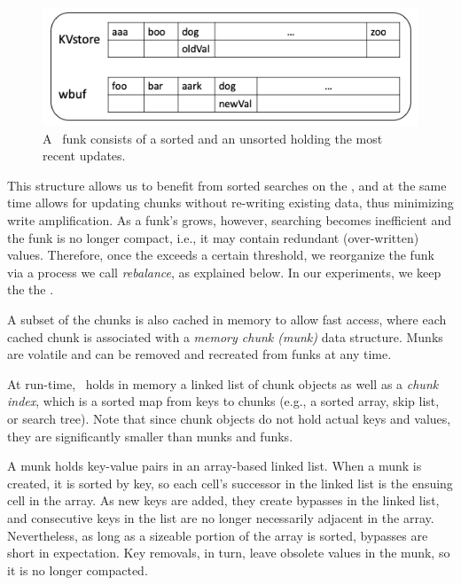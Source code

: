 \begin{figure}[htb]
\centerline{
\includegraphics[width=\columnwidth]{funk.png}
}
\caption{A \sys\ funk consists of a sorted  and an unsorted  holding the most recent updates.}
\label{fig:funk}
\end{figure}

This structure allows us to benefit from sorted searches on the , and at the same time
allows for updating chunks without re-writing existing data, thus minimizing write amplification.
As a funk's   grows, however, searching becomes inefficient   and  
the funk is no longer compact, i.e., it may contain redundant (over-written) values.
Therefore, once the   exceeds a certain threshold, we reorganize the funk
via a process we call \emph{rebalance}, as explained below.
In our experiments, we keep the   the .


A subset of the chunks is also cached in memory to allow fast access, where each cached chunk is associated with a
\emph{memory chunk (munk)}  data structure. 
Munks are volatile and can be removed and recreated from funks at any time.


At run-time, \sys\ holds in memory a linked list of chunk objects as well as 
a \emph{chunk index}, which is a sorted map from keys to chunks (e.g., a sorted array, skip list, or search tree).
Note that since chunk objects do not hold actual keys and values, they are significantly smaller than munks and funks. 

A munk holds key-value pairs in an array-based linked list.  
When a munk is created, 
it is sorted by key, so each cell's successor in the linked list is the ensuing cell in the array.
As new keys are added, they create bypasses in the linked list, and consecutive keys in the
list are no longer necessarily adjacent in the array. Nevertheless, as long as 
a sizeable portion of the  array  is sorted, bypasses are short in expectation.
Key removals, in turn, leave obsolete values in the munk, so it is no longer compacted.


